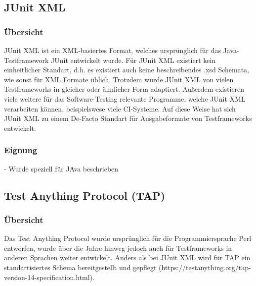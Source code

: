 

\subsection{JUnit XML}\label{JUNIT}
\subsubsection{Übersicht}
JUnit XML ist ein XML-basiertes Format, welches ursprünglich für das Java-Testframework JUnit entwickelt wurde. Für JUnit XML existiert kein einheitlicher Standart, d.h. es existiert auch keine beschreibendes .xsd Schemata, wie sonst für XML Formate üblich. Trotzdem wurde JUnit XML von vielen Testframeworks in gleicher oder ähnlicher Form adaptiert. Außerdem existieren viele weitere für das Software-Testing relevante Programme, welche JUnit XML verarbeiten können, beispielswese viele CI-Systeme. Auf diese Weise hat sich JUnit XML zu einem De-Facto Standart für Ausgabeformate von Testframeworks entwickelt.

\subsubsection{Eignung}
- Wurde speziell für JAva beschrieben



\subsection{Test Anything Protocol (TAP)}
\subsubsection{Übersicht}
Das Test Anything Protocol wurde ursprünglich für die Programmiersprache Perl entworfen, wurde über die Jahre hinweg jedoch auch für Testframeworks in anderen Sprachen weiter entwickelt. Anders als bei JUnit XML wird für TAP ein standartisiertes Schema bereitgestellt und gepflegt (https://testanything.org/tap-version-14-specification.html).

